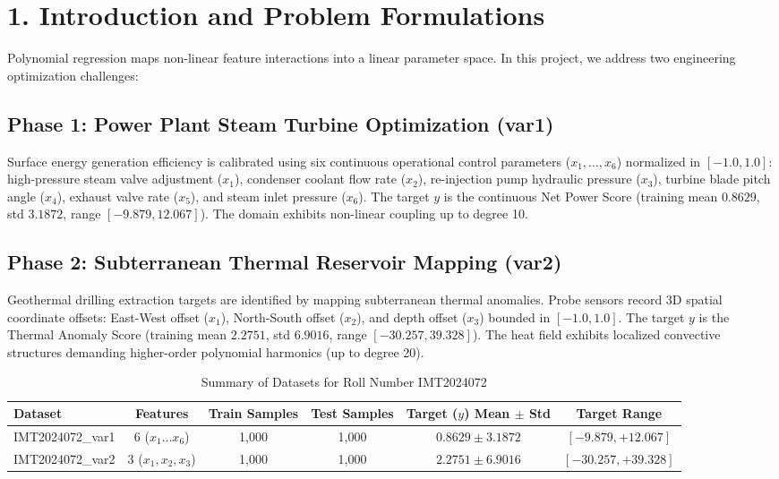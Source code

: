 \documentclass[11pt,a4paper]{article}
\begin{document}
\section{\color{primary} 1. Introduction and Problem Formulations}

Polynomial regression maps non-linear feature interactions into a linear parameter space. In this project, we address two engineering optimization challenges:

\subsection{Phase 1: Power Plant Steam Turbine Optimization (var1)}
Surface energy generation efficiency is calibrated using six continuous operational control parameters ($x_1, \dots, x_6$) normalized in $[-1.0, 1.0]$: high-pressure steam valve adjustment ($x_1$), condenser coolant flow rate ($x_2$), re-injection pump hydraulic pressure ($x_3$), turbine blade pitch angle ($x_4$), exhaust valve rate ($x_5$), and steam inlet pressure ($x_6$). The target $y$ is the continuous Net Power Score (training mean $0.8629$, std $3.1872$, range $[-9.879, 12.067]$). The domain exhibits non-linear coupling up to degree 10.

\subsection{Phase 2: Subterranean Thermal Reservoir Mapping (var2)}
Geothermal drilling extraction targets are identified by mapping subterranean thermal anomalies. Probe sensors record 3D spatial coordinate offsets: East-West offset ($x_1$), North-South offset ($x_2$), and depth offset ($x_3$) bounded in $[-1.0, 1.0]$. The target $y$ is the Thermal Anomaly Score (training mean $2.2751$, std $6.9016$, range $[-30.257, 39.328]$). The heat field exhibits localized convective structures demanding higher-order polynomial harmonics (up to degree 20).

\begin{table}[h]
\centering
\small
\caption{Summary of Datasets for Roll Number IMT2024072}
\label{tab:datasets}
\begin{tabular}{lccccc}
\toprule
\rowcolor{primary} \color{white}\textbf{Dataset} & \color{white}\textbf{Features} & \color{white}\textbf{Train Samples} & \color{white}\textbf{Test Samples} & \color{white}\textbf{Target ($y$) Mean $\pm$ Std} & \color{white}\textbf{Target Range} \\
\midrule
IMT2024072\_var1 & 6 ($x_1 \dots x_6$) & 1,000 & 1,000 & $0.8629 \pm 3.1872$ & $[-9.879, +12.067]$ \\
\rowcolor{tablelight} IMT2024072\_var2 & 3 ($x_1, x_2, x_3$) & 1,000 & 1,000 & $2.2751 \pm 6.9016$ & $[-30.257, +39.328]$ \\
\bottomrule
\end{tabular}
\end{table}
\end{document}
